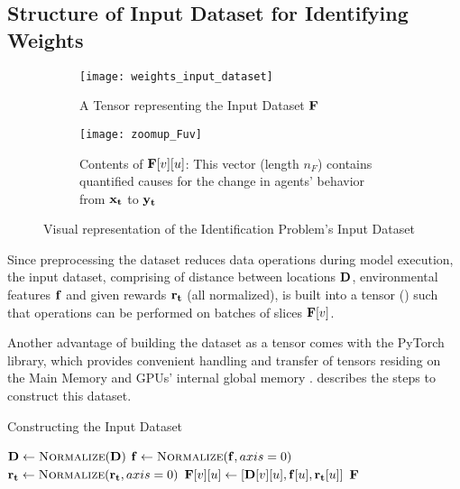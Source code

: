 \subsection{Structure of Input Dataset for Identifying Weights} \label{sec:Structure of Input Dataset for Identifying Weights}
\begin{figure}[!htbp]
    \begin{subfigure}{.64\textwidth}
        \centering
        \texttt{[image: weights\_input\_dataset]}
        \caption{A Tensor representing the Input Dataset $\mathbf{F}$}
        \label{fig:A Tensor representing the complete Input Dataset}
    \end{subfigure}
    \begin{subfigure}{.35\textwidth}
        \centering
        \texttt{[image: zoomup\_Fuv]}
        \caption{Contents of $\mathbf{F}[v][u]$: This vector (length $n_F$) contains quantified causes for the change in agents' behavior from $\mathbf{x_t}$ to $\mathbf{y_t}$}
        \label{fig:Zoomed-in contents of Fvu}
    \end{subfigure}
    \caption{Visual representation of the Identification Problem's Input Dataset}
    \label{fig:Visual representation of the Identification Problem's Input Dataset}
\end{figure}
Since preprocessing the dataset reduces data operations during model execution, the input dataset, comprising of distance between locations $\mathbf{D}$, environmental features $\mathbf{f}$ and given rewards $\mathbf{r_t}$ (all normalized), is built into a tensor () such that operations can be performed on batches of slices $\mathbf{F}[v]$.

Another advantage of building the dataset as a tensor comes with the PyTorch library, which provides convenient handling and transfer of tensors residing on the Main Memory and GPUs' internal global memory \cite{PTDocs}.  describes the steps to construct this dataset.
\begin{algorithm}
    \caption{Constructing the Input Dataset} \label{alg:Constructing the Input Dataset}
    \begin{algorithmic}[1]
        \State $\matr{D} \gets \Call{Normalize}{\matr{D}}$
        \State $\vect{f} \gets \Call{Normalize}{\mathbf{f}, axis = 0}$
        \State $\vect{r_t} \gets \Call{Normalize}{\vect{r_t}, axis = 0}$
                \State $\mathbf{F}[v][u] \gets [\mathbf{D}[v][u], \mathbf{f}[u], \mathbf{r_t}[u]]$ 
             \EndFor
        \EndFor
        \State \Return $\mathbf{F}$
        \EndFunction
    \end{algorithmic}
\end{algorithm}

